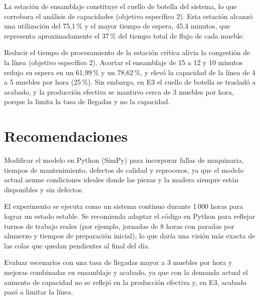 \documentclass[conference,a4paper]{IEEEtran}
\begin{document}
La estación de ensamblaje constituye el cuello de botella del sistema, lo que corrobora el
análisis de capacidades (objetivo específico 2). Esta estación alcanzó una utilización del
75,1\,\% y el mayor tiempo de espera, 45,4 minutos, que representa aproximadamente el
37\,\% del tiempo total de flujo de cada mueble.

Reducir el tiempo de procesamiento de la estación crítica alivia la congestión de la línea
(objetivo específico 2). Acortar el ensamblaje de 15 a 12 y 10 minutos redujo su espera en un
61,99\,\% y un 78,62\,\%, y elevó la capacidad de la línea de 4 a 5 muebles por hora
(25\,\%). Sin embargo, en E3 el cuello de botella se trasladó a acabado, y la producción
efectiva se mantuvo cerca de 3 muebles por hora, porque la limita la tasa de llegadas y no la
capacidad.

\section{Recomendaciones}
Modificar el modelo en Python (SimPy) para incorporar fallas de maquinaria, tiempos de
mantenimiento, defectos de calidad y reprocesos, ya que el modelo actual asume condiciones
ideales donde las piezas y la madera siempre están disponibles y sin defectos.

El experimento se ejecuta como un sistema continuo durante 1\,000 horas para lograr un estado
estable. Se recomienda adaptar el código en Python para reflejar turnos de trabajo reales
(por ejemplo, jornadas de 8 horas con paradas por almuerzo y tiempos de preparación inicial),
lo que daría una visión más exacta de las colas que quedan pendientes al final del día.

Evaluar escenarios con una tasa de llegadas mayor a 3 muebles por hora y mejoras combinadas
en ensamblaje y acabado, ya que con la demanda actual el aumento de capacidad no se reflejó
en la producción efectiva y, en E3, acabado pasó a limitar la línea.



\end{document}
